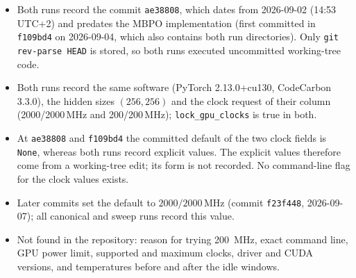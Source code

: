 \begin{itemize}
  \item Both runs record the commit \texttt{ae38808}, which dates from 2026-09-02 (14:53 UTC+2) and predates the MBPO implementation (first committed in \texttt{f109bd4} on 2026-09-04, which also contains both run directories). Only \texttt{git rev-parse HEAD} is stored, so both runs executed uncommitted working-tree code.
  \item Both runs record the same software (PyTorch 2.13.0+cu130, CodeCarbon 3.3.0), the hidden sizes $(256,256)$ and the clock request of their column (\num{2000}/\num{2000}\,MHz and \num{200}/\num{200}\,MHz); \texttt{lock\_\allowbreak gpu\_\allowbreak clocks} is true in both.
  \item At \texttt{ae38808} and \texttt{f109bd4} the committed default of the two clock fields is \texttt{None}, whereas both runs record explicit values. The explicit values therefore come from a working-tree edit; its form is not recorded. No command-line flag for the clock values exists.
  \item Later commits set the default to $2000/2000$\,MHz (commit \texttt{f23f448}, 2026-09-07); all canonical and sweep runs record this value.
  \item Not found in the repository: reason for trying \SI{200}{\mega\hertz}, exact command line, GPU power limit, supported and maximum clocks, driver and CUDA versions, and temperatures before and after the idle windows.
\end{itemize}

